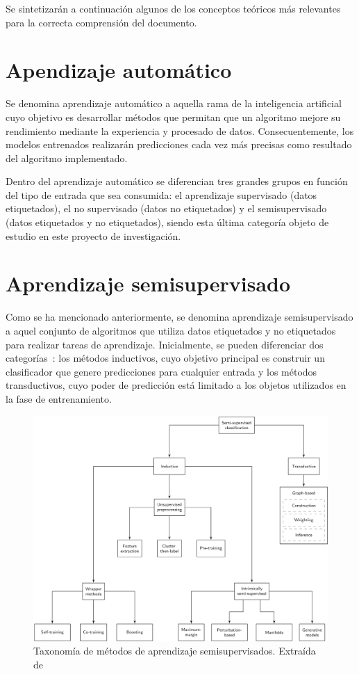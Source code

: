 
Se sintetizarán a continuación algunos de los conceptos teóricos más relevantes para la correcta comprensión del documento.

\section{Apendizaje automático}

Se denomina aprendizaje automático a aquella rama de la inteligencia artificial cuyo objetivo es desarrollar métodos que permitan que un algoritmo mejore su rendimiento mediante la experiencia y procesado de datos. Consecuentemente, los modelos entrenados realizarán predicciones cada vez más precisas como resultado del algoritmo implementado.

Dentro del aprendizaje automático se diferencian tres grandes grupos en función del tipo de entrada que sea consumida: el aprendizaje supervisado (datos etiquetados), el no supervisado (datos no etiquetados) y el semisupervisado (datos etiquetados y no etiquetados), siendo esta última categoría objeto de estudio en este proyecto de investigación. 

\section{Aprendizaje semisupervisado}

Como se ha mencionado anteriormente, se denomina aprendizaje semisupervisado a aquel conjunto de algoritmos que utiliza datos etiquetados y no etiquetados para realizar tareas de aprendizaje. Inicialmente, se pueden diferenciar dos categorías~\cite{engelen2020surveyOnSemiSupervised}: los métodos inductivos, cuyo objetivo principal es construir un clasificador que genere predicciones para cualquier entrada y los métodos transductivos, cuyo poder de predicción está limitado a los objetos utilizados en la fase de entrenamiento.


\begin{figure}[h]
\caption{Taxonomía de métodos de aprendizaje semisupervisados. Extraída de~\cite{engelen2020surveyOnSemiSupervised}}
\centering
\includegraphics[width=\textwidth]{../img/memoria/esquemaHoos}
\end{figure}

